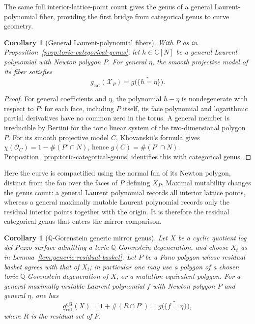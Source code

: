 \documentclass[11pt]{article}
\theoremstyle{plain}
\newtheorem{corollary}[theorem]{Corollary}
\theoremstyle{definition}
\theoremstyle{remark}
\newcommand{\C}{\mathbb C}
\newcommand{\Q}{\mathbb Q}
\newcommand{\1}{\mathbf 1}
\begin{document}
The same full interior-lattice-point count gives the genus of a general Laurent-polynomial fiber, providing the first bridge from categorical genus to curve geometry.

\begin{corollary}[General Laurent-polynomial fibers]\label{cor:toric-laurent-genus}
With $P$ as in Proposition~\ref{prop:toric-categorical-genus}, let $h\in\C[N]$ be a general Laurent polynomial with Newton polygon $P$.  For general $\eta$, the smooth projective model of its fiber satisfies
\[
\boxed{g_{\mathrm{cat}}(\mathcal X_P)
=g\bigl(\widetilde{\{h=\eta\}}\bigr).}
\]
\end{corollary}

\begin{proof}
For general coefficients and $\eta$, the polynomial $h-\eta$ is nondegenerate with respect to $P$: for each face, including $P$ itself, its face polynomial and logarithmic partial derivatives have no common zero in the torus.  A general member is irreducible by Bertini for the toric linear system of the two-dimensional polygon $P$.  For its smooth projective model $C$, Khovanskii's formula \cite[Section 1, Theorem 1]{KhovanskiiGenus} gives $\chi(\mathcal O_C)=1-\#(P^\circ\cap N)$, hence
$g(C)=\#(P^\circ\cap N)$.  Proposition~\ref{prop:toric-categorical-genus} identifies this with categorical genus.
\end{proof}

Here the curve is compactified using the normal fan of its Newton polygon, distinct from the fan over the faces of $P$ defining $X_P$.  Maximal mutability changes the genus count: a general Laurent polynomial records all interior lattice points, whereas a general maximally mutable Laurent polynomial records only the residual interior points together with the origin.  It is therefore the residual categorical genus that enters the mirror comparison.

\begin{corollary}[$\Q$-Gorenstein generic mirror genus]\label{cor:qg-generic-mirror-genus}
Let $X$ be a cyclic quotient log del Pezzo surface admitting a toric $\Q$-Gorenstein degeneration, and choose $X_t$ as in Lemma~\ref{lem:generic-residual-basket}.  Let $P$ be a Fano polygon whose residual basket agrees with that of $X_t$; in particular one may use a polygon of a chosen toric $\Q$-Gorenstein degeneration of $X$, or a mutation-equivalent polygon.  For a general maximally mutable Laurent polynomial $f$ with Newton polygon $P$ and general $\eta$, one has
\begin{equation}\label{eq:qg-generic-mirror-genus}
\boxed{g_{\mathrm{cat}}^{\mathrm{qG}}(X)
=1+\#(R\cap P^\circ)
=g\bigl(\widetilde{\{f=\eta\}}\bigr),}
\end{equation}
where $R$ is the residual set of $P$.
\end{corollary}
\end{document}
